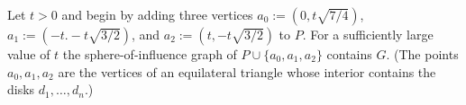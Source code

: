 \documentclass{patmorin}
\begin{document}
Let $t>0$ and begin by adding three vertices $a_0:=(0,t\sqrt{7/4})$, $a_1:=(-t. -t\sqrt{3/2})$, and $a_2:=(t, -t\sqrt{3/2})$ to $P$.  For a sufficiently large value of $t$ the sphere-of-influence graph of $P\cup\{a_0,a_1,a_2\}$ contains $G$.  (The points $a_0,a_1,a_2$ are the vertices of an equilateral triangle whose interior contains the disks $d_1,\ldots,d_n$.)






\end{document}
